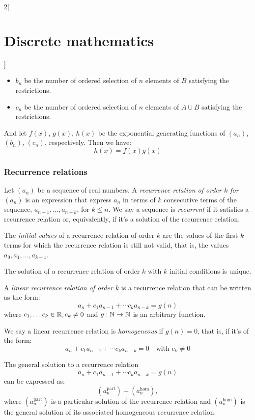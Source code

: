 \documentclass[../../../main.tex]{subfiles}
\begin{document}
\begin{multicols}{2}[\section{Discrete mathematics}]
\begin{prop}
\begin{itemize}
            \item $b_n$ be the number of ordered selection of $n$ elements of $B$ satisfying the restrictions.
            \item $c_n$ be the number of ordered selection of $n$ elements of $A\cup B$ satisfying the restrictions.
        \end{itemize}
        And let $f(x)$, $g(x)$, $h(x)$ be the exponential generating functions of $(a_n)$, $(b_n)$, $(c_n)$, respectively. Then we have: $$h(x)=f(x)g(x)$$
    \end{prop}
    \subsubsection{Recurrence relations}
    \begin{definition}
        Let $(a_n)$ be a sequence of real numbers. A \textit{recurrence relation of order $k$ for $(a_n)$} is an expression that express $a_n$ in terms of $k$ consecutive terms of the sequence, $a_{n-1},\ldots,a_{n-k}$, for $k\leq n$. We say a sequence is \textit{recurrent} if it satisfies a recurrence relation or, equivalently, if it's a solution of the recurrence relation.
    \end{definition}
    \begin{definition}
        The \textit{initial values} of a recurrence relation of order $k$ are the values of the first $k$ terms for which the recurrence relation is still not valid, that is, the values $a_0,a_1,\ldots,a_{k-1}$.
    \end{definition}
    \begin{lemma}
        The solution of a recurrence relation of order $k$ with $k$ initial conditions is unique.
    \end{lemma}
    \begin{definition}
        A \textit{linear recurrence relation of order $k$} is a recurrence relation that can be written as the form: $$a_n+c_1a_{n-1}+\cdots c_ka_{n-k}=g(n)$$ where $c_1,\ldots c_k\in\mathbb{R} , c_k\ne 0$ and $g:\mathbb{N} \rightarrow\mathbb{N} $ is an arbitrary function.
    \end{definition}
    \begin{definition}
        We say a linear recurrence relation is \textit{homogeneous} if $g(n)=0$, that is, if it's of the form: $$a_n+c_1a_{n-1}+\cdots c_ka_{n-k}=0\quad\text{with }c_k\ne 0$$
    \end{definition}
    \begin{prop}
        The general solution to a recurrence relation $$a_n+c_1a_{n-1}+\cdots c_ka_{n-k}=g(n)$$ can be expressed as: $$(a_n^\text{part})+(a_n^\text{hom}),$$ where $(a_n^\text{part})$ is a particular solution of the recurrence relation and $(a_n^\text{hom})$ is the general solution of its associated homogeneous recurrence relation.

\end{prop}
\end{multicols}
\end{document}
